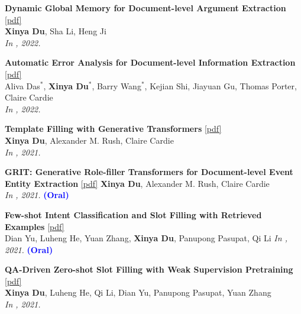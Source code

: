 \begin{enumerate}[{[}1{]},leftmargin=*]
\parbox{\textwidth}{
\item
{\bf Dynamic Global Memory for Document-level Argument Extraction} 
\href{https://aclanthology.org/2022.acl-long.361.pdf}{{[pdf]}} \\
{\bf Xinya Du}, Sha Li, Heng Ji \\
{\it In \ACL, 2022.}\\
}

\item 
{\bf Automatic Error Analysis for Document-level Information Extraction} 
\href{https://aclanthology.org/2022.acl-long.274.pdf}{{[pdf]}} \\
Aliva Das$^{*}$, {\bf Xinya Du}$^{*}$, Barry Wang$^{*}$, Kejian Shi, Jiayuan Gu, Thomas Porter, Claire Cardie \\
{\it In \ACL, 2022.} \\

\item
{\bf Template Filling with Generative Transformers} 
\href{https://aclanthology.org/2021.naacl-main.70.pdf}{{[pdf]}} \\
{{\bf Xinya Du}, Alexander M. Rush, Claire Cardie} \\
{\it In \NAACL, 2021.} \\

\item
{\bf GRIT: Generative Role-ﬁller Transformers for Document-level Event Entity Extraction}
\href{https://aclanthology.org/2021.eacl-main.52.pdf}{{[pdf]}} 
{\textbf{Xinya Du}, Alexander M. Rush, Claire Cardie} \\
{\it In \EACL, 2021.} {\textcolor{blue}{\textbf{(Oral)}}} \\

\item
{\bf Few-shot Intent Classification and Slot Filling with Retrieved Examples}
\href{https://aclanthology.org/2021.naacl-main.59.pdf}{{[pdf]}} \\
{Dian Yu, Luheng He, Yuan Zhang, \textbf{Xinya Du}, Panupong Pasupat, Qi Li} 
{\it In \NAACL, 2021.} {\textcolor{blue}{\textbf{(Oral)}}} \\ 

\parbox{\textwidth}{
\item
{\bf QA-Driven Zero-shot Slot Filling with Weak Supervision Pretraining}
\href{https://aclanthology.org/2021.acl-short.83.pdf}{{[pdf]}} \\
{{\bf Xinya Du}, Luheng He, Qi Li, Dian Yu, Panupong Pasupat, Yuan Zhang} \\
{\it In \ACL, 2021.}\\
}


\end{enumerate}
